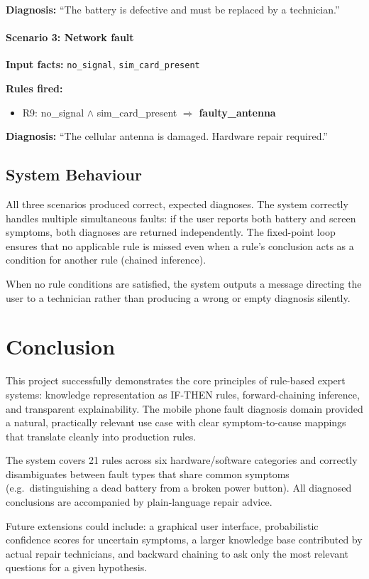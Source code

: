 \documentclass[12pt,a4paper]{article}
\begin{document}
\textbf{Diagnosis:} ``The battery is defective and must be replaced by a technician.''

\paragraph{Scenario 3: Network fault}

\textbf{Input facts:} \texttt{no\_signal}, \texttt{sim\_card\_present}

\textbf{Rules fired:}
\begin{itemize}[nosep]
    \item R9: no\_signal $\wedge$ sim\_card\_present $\Rightarrow$ \textbf{faulty\_antenna}
\end{itemize}

\textbf{Diagnosis:} ``The cellular antenna is damaged. Hardware repair required.''

\subsection{System Behaviour}

All three scenarios produced correct, expected diagnoses. The system correctly
handles multiple simultaneous faults: if the user reports both battery and screen
symptoms, both diagnoses are returned independently. The fixed-point loop ensures
that no applicable rule is missed even when a rule's conclusion acts as a condition
for another rule (chained inference).

When no rule conditions are satisfied, the system outputs a message directing the
user to a technician rather than producing a wrong or empty diagnosis silently.

\section{Conclusion}

This project successfully demonstrates the core principles of rule-based expert
systems: knowledge representation as IF-THEN rules, forward-chaining inference,
and transparent explainability. The mobile phone fault diagnosis domain provided
a natural, practically relevant use case with clear symptom-to-cause mappings
that translate cleanly into production rules.

The system covers 21 rules across six hardware/software categories and correctly
disambiguates between fault types that share common symptoms (e.g.\ distinguishing
a dead battery from a broken power button). All diagnosed conclusions are
accompanied by plain-language repair advice.

Future extensions could include: a graphical user interface, probabilistic
confidence scores for uncertain symptoms, a larger knowledge base contributed by
actual repair technicians, and backward chaining to ask only the most relevant
questions for a given hypothesis.

\end{document}
